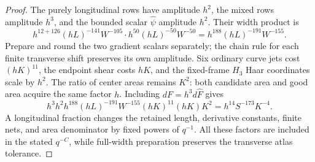 \documentclass[11pt]{amsart}
\theoremstyle{definition}
\theoremstyle{remark}
\numberwithin{equation}{section}
\begin{document}
\begin{proof}
The purely longitudinal rows have amplitude $h^2$, the mixed rows amplitude $h^3$, and the bounded scalar $\widehat\psi$ amplitude $h^2$. Their width product is
\[
h^{12+126}(hL)^{-141}W^{-105}\cdot h^{50}(hL)^{-50}W^{-50}
=h^{188}(hL)^{-191}W^{-155}.
\]
Prepare and round the two gradient scalars separately; the chain rule for each finite transverse shift preserves its own amplitude. Six ordinary curve jets cost $(hK)^{11}$, the endpoint shear costs $hK$, and the fixed-frame $H_3$ Haar coordinates scale by $h^2$. The ratio of center areas remains $K^2$: both candidate area and good area acquire the same factor $h$. Including $dF=h^3d\widehat F$ gives
\begin{equation}\label{low:6:nc36:inflection-paid-h}
h^3h^2h^{188}(hL)^{-191}W^{-155}(hK)^{11}(hK)K^2
=h^{14}S^{-173}K^{-4}.
\end{equation}
A longitudinal fraction changes the retained length, derivative constants, finite nets, and area denominator by fixed powers of $q^{-1}$. All these factors are included in the stated $q^{-C}$, while full-width preparation preserves the transverse atlas tolerance.
\end{proof}
\end{document}
